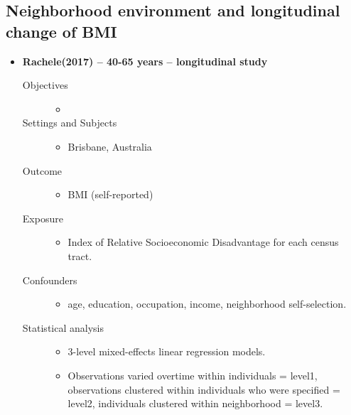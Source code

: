 \documentclass{article}
\begin{document}
\subsection{Neighborhood environment and longitudinal change of BMI}
\begin{itemize}
	\item{\bf Rachele(2017) -- 40-65 years -- longitudinal study} 
		\begin{description}
			\item[Objectives] \mbox{}\par
				\begin{itemize}
					\item 
				\end{itemize} 
			\item[Settings and Subjects]\mbox{}\par 
				\begin{itemize}
					\item Brisbane, Australia
				\end{itemize} 
			\item[Outcome] \mbox{}\par
				\begin{itemize}
					\item BMI (self-reported)
				\end{itemize} 
			\item[Exposure] \mbox{}\par
				\begin{itemize}
					\item Index of Relative Socioeconomic Disadvantage for each census tract.
				\end{itemize} 
			\item[Confounders] \mbox{}\par
				\begin{itemize}
					\item age, education, occupation, income, neighborhood self-selection.
				\end{itemize} 
			\item[Statistical analysis] \mbox{}\par
				\begin{itemize}
					\item 3-level mixed-effects linear regression models. 
					\item Observations varied overtime within individuals = level1, observations clustered within individuals who were specified = level2, individuals clustered within neighborhood = level3. 

\end{itemize}
\end{description}
\end{itemize}
\end{document}
